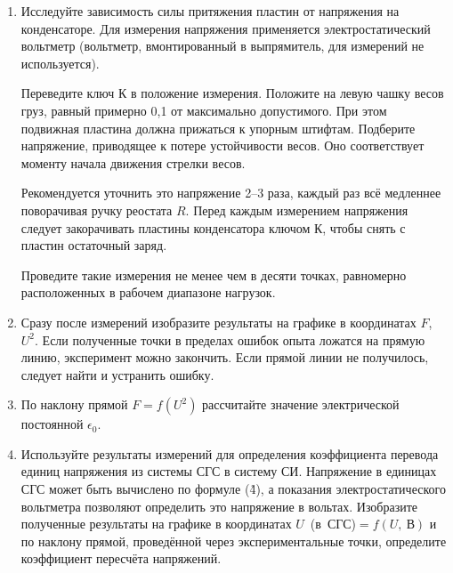 \begin{lab:task}
\begin{enumerate}
		При необходимости проведите регулировку положения коромысла весов. Для этого снова арретируйте весы и, перемещая
		тарировочные гайки, расположенные на концах коромысла, добейтесь того, чтобы стрелка весов оказалась на нулевом делении
		шкалы. Поворот гаек и изменение груза на чашке весов , а проверка
		положения коромысла~--- когда весы сняты с арретира. Для изменения груза открываются боковые дверцы весов (фронтальная
		дверца открывается только на время ремонта).
		
		\item Исследуйте зависимость силы притяжения пластин от напряжения на конденсаторе. Для измерения напряжения применяется
		электростатический вольтметр (вольтметр, вмонтированный в выпрямитель, для измерений не используется).
		
		Переведите ключ К в положение измерения. Положите на левую чашку весов груз, равный примерно 0,1 от максимально
		допустимого. При этом подвижная пластина должна прижаться к упорным штифтам. Подберите напряжение, приводящее к потере
		устойчивости весов. Оно соответствует моменту начала движения стрелки весов.
		
		Рекомендуется уточнить это напряжение 2--3 раза, каждый раз всё медленнее поворачивая ручку реостата $R$. Перед каждым
		измерением напряжения следует закорачивать пластины конденсатора ключом К, чтобы снять с пластин остаточный заряд.
		
		Проведите такие измерения не менее чем в десяти точках, равномерно расположенных в рабочем диапазоне нагрузок.
		
		\item Сразу после измерений изобразите результаты на графике в координатах $F$, $U^2$. Если полученные точки в пределах
		ошибок опыта ложатся на прямую линию, эксперимент можно закончить. Если прямой линии не получилось, следует найти и
		устранить ошибку.
		
		\item По наклону прямой $F=f(U^2)$  рассчитайте значение электрической постоянной $\epsilon_0$.
		
		\item Используйте результаты измерений для определения коэффициента перевода единиц напряжения из системы СГС в систему СИ.
		Напряжение в единицах СГС может быть вычислено по формуле (\r{4}), а показания электростатического вольтметра позволяют
		определить это напряжение в вольтах. Изобразите полученные результаты на графике в координатах $U$~(в~СГС)$=f(U,~В)$ и по
		наклону прямой, проведённой через экспериментальные точки, определите коэффициент пересчёта напряжений.

	\end{enumerate}

\end{lab:task}

